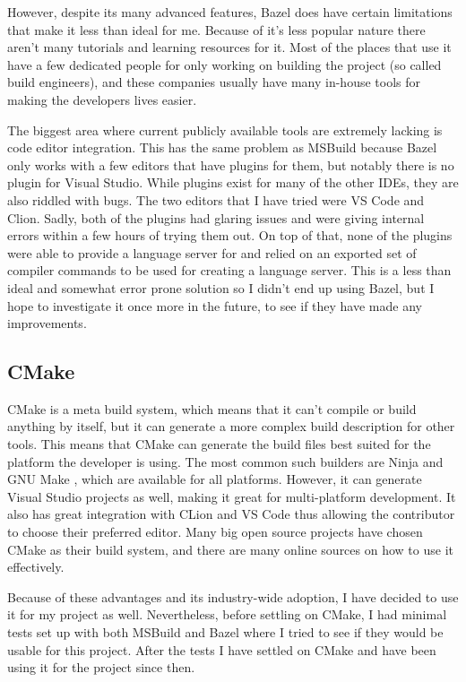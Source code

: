 However, despite its many advanced features, Bazel does have certain limitations that make it less than ideal for me. Because of it's less popular nature there aren't many tutorials and learning resources for it. Most of the places that use it have a few dedicated people for only working on building the project (so called build engineers), and these companies usually have many in-house tools for making the developers lives easier.

The biggest area where current publicly available tools are extremely lacking is code editor integration. This has the same problem as MSBuild because Bazel only works with a few editors that have plugins for them, but notably there is no plugin for Visual Studio. While plugins exist for many of the other IDEs, they are also riddled with bugs. The two editors that I have tried were VS Code and Clion. Sadly, both of the plugins had glaring issues and were giving internal errors within a few hours of trying them out. On top of that, none of the plugins were able to provide a language server for \Cpp and relied on an exported set of compiler commands to be used for creating a language server. This is a less than ideal and somewhat error prone solution so I didn't end up using Bazel, but I hope to investigate it once more in the future, to see if they have made any improvements.

\subsection{CMake}

CMake is a meta build system, which means that it can't compile or build anything by itself, but it can generate a more complex build description for other tools. This means that CMake can generate the build files best suited for the platform the developer is using.
The most common such builders are Ninja \cite{ninja} and GNU Make \cite{make}, which are available for all platforms. However, it can generate Visual Studio projects as well, making it great for multi-platform development. It also has great integration with CLion and VS Code thus allowing the contributor to choose their preferred editor. Many big open source projects have chosen CMake as their build system, and there are many online sources on how to use it effectively.

Because of these advantages and its industry-wide adoption, I have decided to use it for my project as well. Nevertheless, before settling on CMake, I had minimal tests set up with both MSBuild and Bazel where I tried to see if they would be usable for this project. After the tests I have settled on CMake and have been using it for the project since then.

